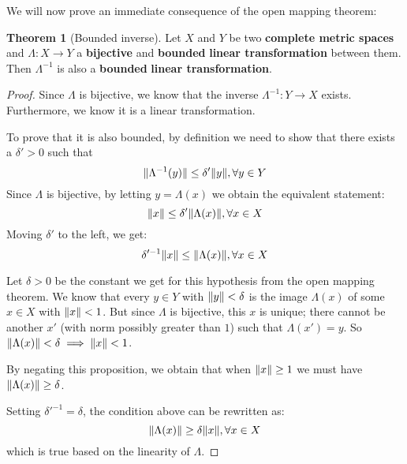\documentclass[a4paper, 12pt]{article}
\theoremstyle{definition}
\newtheorem*{theorem}{Theorem}
\newcommand{\complex}{\symbb{C}}
\DeclarePairedDelimiter{\norm}{\lVert}{\rVert}
\begin{document}
We will now prove an immediate consequence of the open mapping theorem:
\begin{theorem}[Bounded inverse]
Let \(X\) and \(Y\) be two \textbf{complete metric spaces} and \(\Lambda \colon X \to Y\) a \textbf{bijective} and \textbf{bounded} \textbf{linear transformation} between them. Then \(\Lambda^{-1}\) is also a \textbf{bounded} \textbf{linear transformation}.
\end{theorem}
\begin{proof}
Since \(\Lambda\) is bijective, we know that the inverse \(\Lambda^{-1} \colon Y \to X\) exists. Furthermore, we know it is a linear transformation.

\begin{comment}
Furthermore, we can check that it is a linear transformation. We know \(\Lambda\) is linear, therefore
\[
    a \Lambda(u) + b \Lambda(v) = \Lambda(au + bv)
\]
for all \(a, b \in \complex\), \(u, v \in X\). Then, by applying \(\Lambda^{-1}\) to the equation we get
\[
    \Lambda^{-1} (a \Lambda(u) + b \Lambda(v)) = \Lambda^{-1}(\Lambda(au + bv)) = au + bv
\]
If we denote \(\Lambda(u)\) with \(u'\), \(\Lambda(v)\) with \(v'\), then \(u = \Lambda^{-1}(u')\) and \(v = \Lambda^{-1}(v')\). We have that
\[
    \Lambda^{-1} (a u' + b v') = a \Lambda^{-1} (u') + b \Lambda^{-1} (v')
\]
for all \(u', v' \in Y\), since \(\Lambda\) is surjective.
\end{comment}

To prove that it is also bounded, by definition we need to show that there exists a \(\delta' > 0\) such that
\[
    \norm{\Lambda^{-1}(y)} \leq \delta' \norm{y}, \forall y \in Y
\]
Since \(\Lambda\) is bijective, by letting \(y = \Lambda(x)\) we obtain the equivalent statement:
\[
    \norm{x} \leq \delta' \norm{\Lambda(x)}, \forall x \in X
\]
Moving \(\delta'\) to the left, we get:
\[
    \delta'^{-1} \norm{x} \leq \norm{\Lambda(x)}, \forall x \in X
\]

Let \(\delta > 0\) be the constant we get for this hypothesis from the open mapping theorem. We know that every \(y \in Y\) with \(\norm{y} < \delta\) is the image \(\Lambda(x)\) of some \(x \in X\) with \(\norm{x} < 1\). But since \(\Lambda\) is bijective, this \(x\) is unique; there cannot be another \(x'\) (with norm possibly greater than \(1\)) such that \(\Lambda(x') = y\). So \(\norm{\Lambda(x)} < \delta \implies \norm{x} < 1\).

By negating this proposition, we obtain that when \(\norm{x} \geq 1\) we must have \(\norm{\Lambda(x)} \geq \delta\).

Setting \(\delta'^{-1} = \delta\), the condition above can be rewritten as:
\[
    \norm{\Lambda(x)} \geq \delta \norm{x}, \forall x \in X
\]
which is true based on the linearity of \(\Lambda\).
\end{proof}
\end{document}
